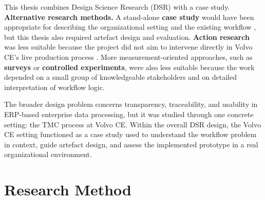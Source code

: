 This thesis combines Design Science Research (DSR) with a case study. \textbf{Alternative research methods.} A stand-alone \textbf{case study} would have been appropriate for describing the organizational setting and the existing workflow \cite{yin2018}, but this thesis also required artefact design and evaluation. \textbf{Action research} was less suitable because the project did not aim to intervene directly in Volvo CE's live production process \cite{susman1978}. More measurement-oriented approaches, such as \textbf{surveys} or \textbf{controlled experiments}, were also less suitable because the work depended on a small group of knowledgeable stakeholders and on detailed interpretation of workflow logic.

The broader design problem concerns transparency, traceability, and usability in ERP-based enterprise data processing, but it was studied through one concrete setting: the TMC process at Volvo CE. Within the overall DSR design, the Volvo CE setting functioned as a case study used to understand the workflow problem in context, guide artefact design, and assess the implemented prototype in a real organizational environment.



\section{Research Method}




